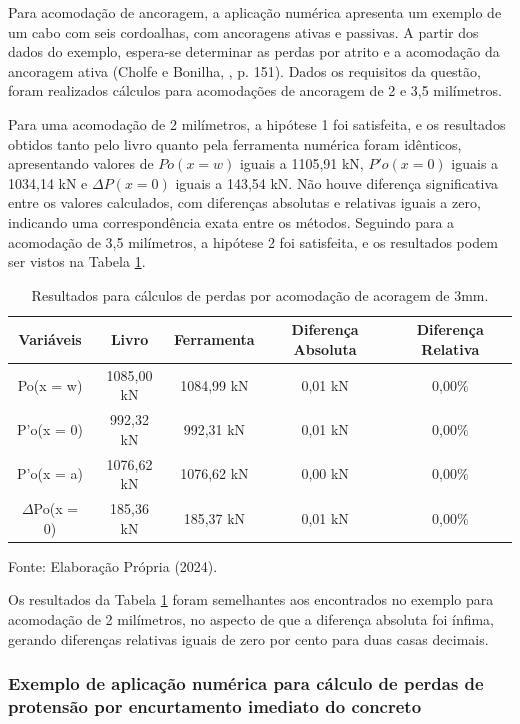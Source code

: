 \hspace{0.4cm}Para acomodação de ancoragem, a aplicação numérica apresenta um exemplo de um cabo com seis cordoalhas, com ancoragens ativas e passivas. A partir dos dados do exemplo, espera-se determinar as perdas por atrito e a acomodação da ancoragem ativa (Cholfe e Bonilha, \citeyear{CB}, p. 151). Dados os requisitos da questão, foram realizados cálculos para acomodações de ancoragem de 2 e 3,5 milímetros.

Para uma acomodação de 2 milímetros, a hipótese 1 foi satisfeita, e os resultados obtidos tanto pelo livro quanto pela ferramenta numérica foram idênticos, apresentando valores de $Po(x=w)$ iguais a 1105,91 kN, $P'o(x=0)$ iguais a 1034,14 kN e $\Delta P(x = 0)$ iguais a 143,54 kN. Não houve diferença significativa entre os valores calculados, com diferenças absolutas e relativas iguais a zero, indicando uma correspondência exata entre os métodos. Seguindo para a acomodação de 3,5 milímetros, a hipótese 2 foi satisfeita, e os resultados podem ser vistos na Tabela \ref{tab:perdas_piac_3}.

\begin{table}[h!]
\centering
\begin{tabular}{ccccc}
\hline
Variáveis & Livro & Ferramenta & Diferença Absoluta & Diferença Relativa \\ \hline
Po(x = w) & 1085,00 kN & 1084,99 kN & 0,01  kN & 0,00\% \\
P’o(x = 0) & 992,32 kN & 992,31 kN & 0,01 kN & 0,00\% \\
P’o(x = a) & 1076,62 kN & 1076,62 kN & 0,00 kN & 0,00\% \\
$\Delta$Po(x = 0) & 185,36 kN & 185,37 kN & 0,01 kN & 0,00\% \\ \hline
\end{tabular}
\caption{\label{tab:perdas_piac_3} Resultados para cálculos de perdas por acomodação de acoragem de 3mm.}Fonte: Elaboração Própria (2024).
\end{table}

Os resultados da Tabela \ref{tab:perdas_piac_3} foram semelhantes aos encontrados no exemplo para acomodação de 2 milímetros, no aspecto de que a diferença absoluta foi ínfima, gerando diferenças relativas iguais de zero por cento para duas casas decimais.

\subsubsection{Exemplo de aplicação numérica para cálculo de perdas de protensão por encurtamento imediato do concreto}

